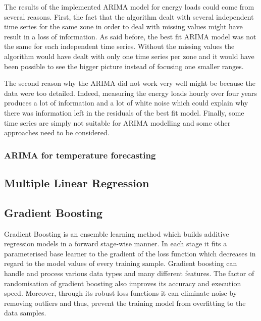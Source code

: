 \documentclass{article} %
\begin{document}
The results of the implemented ARIMA model for energy loads could come from several reasons. First, the fact that the algorithm dealt with several independent time series for the same zone in order to deal with missing values might have result in a loss of information. As said before, the best fit ARIMA model was not the same for each independent time series. Without the missing values the algorithm would have dealt with only one time series per zone and it would have been possible to see the bigger picture instead of focusing one smaller ranges.

The second reason why the ARIMA did not work very well might be because the data were too detailed. Indeed, measuring the energy loads hourly over four years produces a lot of information and a lot of white noise which could explain why there was information left in the residuals of the best fit model. Finally, some time series are simply not suitable for ARIMA modelling and some other approaches need to be considered.


\subsubsection*{ARIMA for temperature forecasting}

\subsection*{Multiple Linear Regression}

\subsection*{Gradient Boosting}
Gradient Boosting is an ensemble learning method which builds additive regression models in a forward stage-wise manner. In each stage it fits a parameterised base learner to the gradient of the loss function which decreases in regard to the model values of every training sample. Gradient boosting can handle and process various data types and many different features. The factor of randomisation of gradient boosting also improves its accuracy and execution speed. Moreover, through its robust loss functions it can eliminate noise by removing outliers and thus, prevent the training model from overfitting to the data samples.
\end{document}

